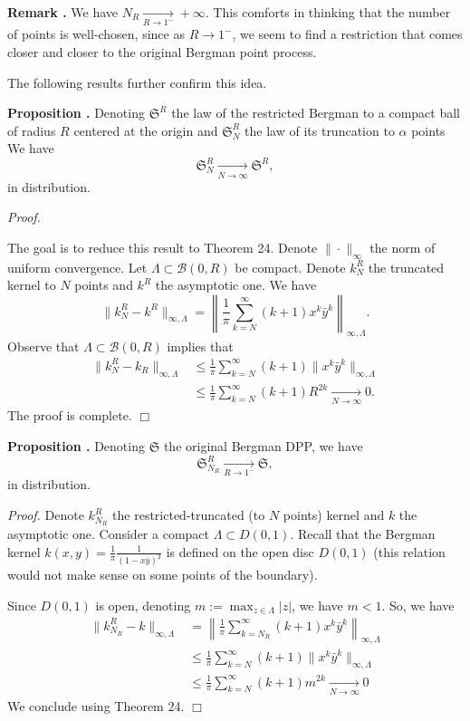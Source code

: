 \documentclass[11pt]{article}
\newcommand{\qed}{\hfill$\Box$}
\newcounter{cnt}
\newcommand{\cnt}{\thecnt \stepcounter{cnt}}
\begin{document}
\textbf{Remark \cnt.} We have $N_R \xrightarrow[R \to 1^-]{} +\infty$. This comforts in thinking that the number of points is well-chosen, since as $R \to 1^-$, we seem to find a restriction that comes closer and closer to the original Bergman point process.

The following results further confirm this idea.

\textbf{Proposition \cnt.} Denoting $\mathfrak{S}^R$ the law of the restricted Bergman to a compact ball of radius $R$ centered at the origin and $\mathfrak{S}_N^R$ the law of its truncation to $\alpha$ points We have
\[
\mathfrak{S}_N^R \xrightarrow[N \to \infty]{} \mathfrak{S}^R,
\]
in distribution.

\textit{Proof.}

The goal is to reduce this result to Theorem 24. Denote $\|\cdot\|_\infty$ the norm of uniform convergence. Let $\Lambda \subset \mathcal{B}(0,R)$ be compact. Denote $k_N^R$ the truncated kernel to $N$ points and $k^R$ the asymptotic one. We have
\[
\|k_N^R - k^R\|_{\infty, \Lambda} = \left\| \frac{1}{\pi} \sum_{k=N}^\infty (k+1) x^k \bar{y}^k \right\|_{\infty, \Lambda}.
\]
Observe that $\Lambda \subset \mathcal{B}(0,R)$ implies that
\begin{align*}
\|k_{N}^R - k_R\|_{\infty, \Lambda} &\le \frac{1}{\pi} \sum_{k=N}^\infty (k+1) \|x^k \bar{y}^k\|_{\infty, \Lambda} \\
&\le \frac{1}{\pi} \sum_{k=N}^\infty (k+1) R^{2k} \xrightarrow[N \to \infty]{} 0.
\end{align*}
The proof is complete. \qed

\textbf{Proposition \cnt.} Denoting $\mathfrak{S}$ the original Bergman DPP, we have
\[
\mathfrak{S}_{N_R}^R \xrightarrow[R \to 1^-]{} \mathfrak{S},
\]
in distribution.

\textit{Proof.}
Denote $k_{N_R}^R$ the restricted-truncated (to $N$ points) kernel and $k$ the asymptotic one. Consider a compact $\Lambda \subset D(0,1)$. Recall that the Bergman kernel $k(x,y) = \frac{1}{\pi}\frac{1}{(1-x\bar{y})^2}$ is defined on the open disc $D(0,1)$ (this relation would not make sense on some points of the boundary).

Since $D(0,1)$ is open, denoting $m := \max_{z \in \Lambda} |z|$, we have $m < 1$. So, we have
\begin{align*}
\|k_{N_R}^R - k\|_{\infty, \Lambda} &= \left\| \frac{1}{\pi} \sum_{k=N_R}^\infty (k+1) x^k \bar{y}^k \right\|_{\infty, \Lambda} \\
&\le \frac{1}{\pi} \sum_{k=N}^\infty (k+1) \|x^k \bar{y}^k\|_{\infty, \Lambda} \\
&\le \frac{1}{\pi} \sum_{k=N}^\infty (k+1) m^{2k} \xrightarrow[N \to \infty]{} 0
\end{align*}
We conclude using Theorem 24. \qed
\end{document}
